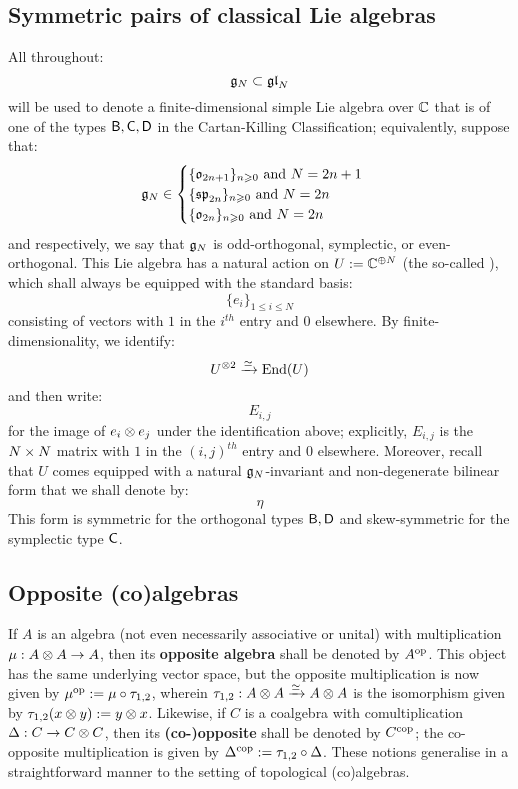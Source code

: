         \subsection{Symmetric pairs of classical Lie algebras}
            All throughout:
                $$\mathfrak{g}_N \subset \mathfrak{gl}_N$$
            will be used to denote a finite-dimensional simple Lie algebra over $\mathbb{C}$ that is of one of the types $\mathsf{B}, \mathsf{C}, \mathsf{D}$ in the Cartan-Killing Classification; equivalently, suppose that:
                $$
                    \mathfrak{g}_N \in
                    \begin{cases}
                        \text{$\{ \mathfrak{o}_{2n + 1} \}_{n \geqslant 0}$ and $N = 2n + 1$}
                        \\
                        \text{$\{ \mathfrak{sp}_{2n} \}_{n \geqslant 0}$ and $N = 2n$}
                        \\
                        \text{$\{ \mathfrak{o}_{2n} \}_{n \geqslant 0}$ and $N = 2n$}
                    \end{cases}
                $$
            and respectively, we say that $\mathfrak{g}_N$ is odd-orthogonal, symplectic, or even-orthogonal. This Lie algebra has a natural action on $U := \mathbb{C}^{\oplus N}$ (the so-called ), which shall always be equipped with the standard basis:
                $$\{e_i\}_{1 \leq i \leq N}$$
            consisting of vectors with $1$ in the $i^{th}$ entry and $0$ elsewhere. By finite-dimensionality, we identify:
                $$U^{\tensor 2} \xrightarrow[]{\cong} \End(U)$$
            and then write:
                $$E_{i, j}$$
            for the image of $e_i \tensor e_j$ under the identification above; explicitly, $E_{i, j}$ is the $N \x N$ matrix with $1$ in the $(i, j)^{th}$ entry and $0$ elsewhere. Moreover, recall that $U$ comes equipped with a natural $\mathfrak{g}_N$-invariant and non-degenerate bilinear form that we shall denote by:
                $$\eta$$
            This form is symmetric for the orthogonal types $\mathsf{B}, \mathsf{D}$ and skew-symmetric for the symplectic type $\mathsf{C}$.

        \subsection{Opposite (co)algebras}
            If $A$ is an algebra (not even necessarily associative or unital) with multiplication $\mu: A \tensor A \to A$, then its \textbf{opposite algebra} shall be denoted by $A^{\mathrm{op}}$. This object has the same underlying vector space, but the opposite multiplication is now given by $\mu^{\mathrm{op}} := \mu \circ \tau_{1, 2}$, wherein $\tau_{1, 2}: A \tensor A \xrightarrow[]{\cong} A \tensor A$ is the isomorphism given by $\tau_{1, 2}(x \tensor y) := y \tensor x$. Likewise, if $C$ is a coalgebra with comultiplication $\Delta: C \to C \tensor C$, then its \textbf{(co-)opposite} shall be denoted by $C^{\mathrm{cop}}$; the co-opposite multiplication is given by $\Delta^{\mathrm{cop}} := \tau_{1, 2} \circ \Delta$. These notions generalise in a straightforward manner to the setting of topological (co)algebras.

